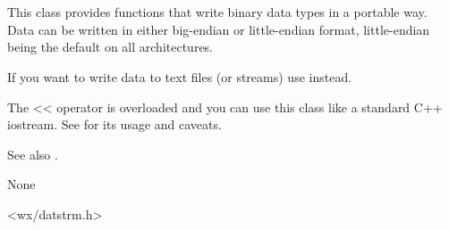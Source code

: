 \section{}\label{wxdataoutputstream}

This class provides functions that write binary data types in a
portable way. Data can be written in either big-endian or little-endian
format, little-endian being the default on all architectures.

If you want to write data to text files (or streams) use 
 instead.

The << operator is overloaded and you can use this class like a standard 
C++ iostream. See  for its 
usage and caveats.

See also . 


None


<wx/datstrm.h>


\label{wxdataoutputstreamctor}


